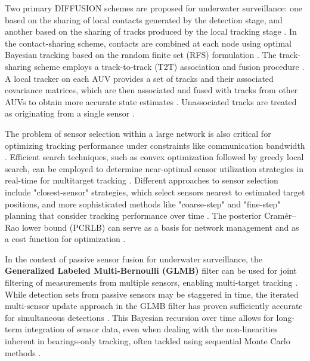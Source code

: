 Two primary DIFFUSION schemes are proposed for underwater surveillance: one based on the sharing of local contacts generated by the detection stage, and another based on the sharing of tracks produced by the local tracking stage \cite{braca2015distributed}. In the contact-sharing scheme, contacts are combined at each node using optimal Bayesian tracking based on the random finite set (RFS) formulation \cite{braca2015distributed}. The track-sharing scheme employs a track-to-track (T2T) association and fusion procedure \cite{braca2015distributed}. A local tracker on each AUV provides a set of tracks and their associated covariance matrices, which are then associated and fused with tracks from other AUVs to obtain more accurate state estimates \cite{braca2015distributed}. Unassociated tracks are treated as originating from a single sensor \cite{braca2015distributed}.

The problem of sensor selection within a large network is also critical for optimizing tracking performance under constraints like communication bandwidth \cite{tharmarasa2007large}. Efficient search techniques, such as convex optimization followed by greedy local search, can be employed to determine near-optimal sensor utilization strategies in real-time for multitarget tracking \cite{tharmarasa2007large}. Different approaches to sensor selection include "closest-sensor" strategies, which select sensors nearest to estimated target positions, and more sophisticated methods like "coarse-step" and "fine-step" planning that consider tracking performance over time \cite{tharmarasa2007large}. The posterior Cramér–Rao lower bound (PCRLB) can serve as a basis for network management and as a cost function for optimization \cite{tharmarasa2007large}.

In the context of passive sensor fusion for underwater surveillance, the \textbf{Generalized Labeled Multi-Bernoulli (GLMB)} filter can be used for joint filtering of measurements from multiple sensors, enabling multi-target tracking \cite{uney2022passive}. While detection sets from passive sensors may be staggered in time, the iterated multi-sensor update approach in the GLMB filter has proven sufficiently accurate for simultaneous detections \cite{uney2022passive}. This Bayesian recursion over time allows for long-term integration of sensor data, even when dealing with the non-linearities inherent in bearings-only tracking, often tackled using sequential Monte Carlo methods \cite{uney2022passive}.


\endinput